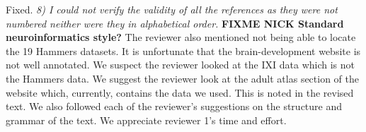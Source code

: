 \documentclass[11pt]{article}
\begin{document}
\newline
Fixed.  
\newline
\newline
{\em 8) I could not verify the validity of all the references as they were not numbered neither were they in alphabetical order. }
\newline
\newline
{\bf FIXME NICK Standard neuroinformatics style?}
\newline
\newline
The reviewer also mentioned not being able to locate the 19 Hammers
datasets.  It is unfortunate that the brain-development website is not
well annotated.  We suspect the reviewer looked at the IXI data which
is not the Hammers data.  We suggest the reviewer look at the adult
atlas section of the website which, currently, contains the data we
used.  This is noted in the revised text. 
\newline
\newline
We also followed each of the reviewer's suggestions on the structure
and grammar of the text. 
\newline
\newline
We appreciate reviewer 1's time and effort.  
\newline
\newline
\end{document}
